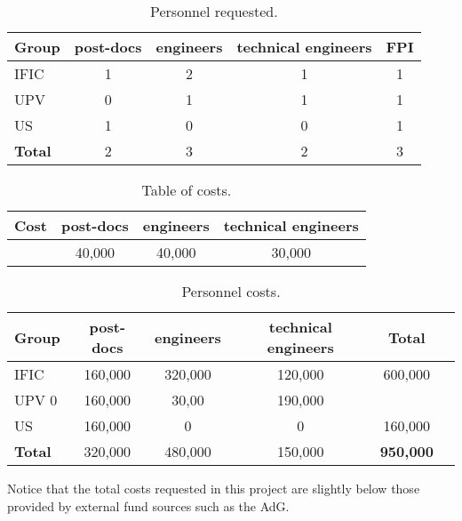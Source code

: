 \begin{table}[h!]
\begin{center}
\begin{tabular}{|l|c|c|c|c|}
\hline
Group &	post-docs	& engineers &	technical engineers & FPI\\
 \hline
IFIC &	1 &	2	&1 &	1\\			
UPV	  & 0	&1 &	1 &	1 \\			
US	& 1 &	0 &	0 &	 1\\			
 \hline
{\bf Total} & 2 & 3 & 2 & 3 \\
 \hline\hline
\end{tabular}  
\caption{Personnel requested.}
\label{tab.P}
\end{center}
\end{table} 

\begin{table}[h!]
\begin{center}
\begin{tabular}{|l|c|c|c|}
\hline
Cost &	post-docs	& engineers &	technical engineers \\
 \hline
 &	40,000 &	40,000	&30,000 \\					
 \hline\hline
\end{tabular}  
\caption{Table of costs.}
\label{tab.new:PT}
\end{center}
\end{table} 

\begin{table}[h!]
\begin{center}
\begin{tabular}{|l|c|c|c|c|c|}
\hline
Group &	post-docs	& engineers &	technical engineers &  Total \\
 \hline
IFIC	&160,000 &	320,000 &	120,000 & 600,000 \\
UPV	 	0 & 160,000 &	30,00 &	190,000 \\
US	& 160,000 & 0 & 0 &	160,000\\
\hline
{\bf Total} & 320,000 & 480,000 & 150,000 & {\bf 950,000} \\
 \hline\hline
\end{tabular}  
\caption{Personnel costs.}
\label{tab.new:PC}
\end{center}
\end{table} 

Notice that the total costs requested in this project are slightly below those provided by external fund sources such as the AdG. 

